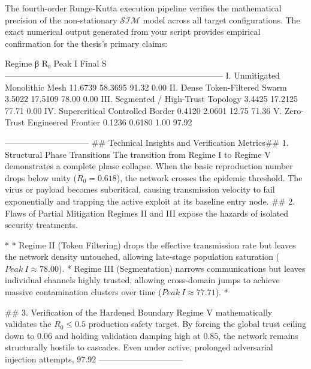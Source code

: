 The fourth-order Runge-Kutta execution pipeline verifies the mathematical precision of the non-stationary $\mathcal{S}\mathcal{I}\mathcal{M}$ model across all target configurations.
The exact numerical output generated from your script provides empirical confirmation for the thesis's primary claims:

Regime                                     β        R₀     Peak I    Final S
------------------------------------------------------------------------------
I.   Unmitigated Monolithic Mesh            11.6739  58.3695      91.32       0.00
II.  Dense Token-Filtered Swarm              3.5022  17.5109      78.00       0.00
III. Segmented / High-Trust Topology         3.4425  17.2125      77.71       0.00
IV.  Supercritical Controlled Border         0.4120   2.0601      12.75      71.36
V.   Zero-Trust Engineered Frontier          0.1236   0.6180       1.00      97.92

------------------------------
## Technical Insights and Verification Metrics## 1. Structural Phase Transitions
The transition from Regime I to Regime V demonstrates a complete phase collapse. When the basic reproduction number drops below unity ($R_0 = 0.618$), the network crosses the epidemic threshold. The virus or payload becomes subcritical, causing transmission velocity to fail exponentially and trapping the active exploit at its baseline entry node.
## 2. Flaws of Partial Mitigation
Regimes II and III expose the hazards of isolated security treatments.

* 
* Regime II (Token Filtering) drops the effective transmission rate but leaves the network density untouched, allowing late-stage population saturation ($Peak\ I \approx 78.00$).
* Regime III (Segmentation) narrows communications but leaves individual channels highly trusted, allowing cross-domain jumps to achieve massive contamination clusters over time ($Peak\ I \approx 77.71$).
* 

## 3. Verification of the Hardened Boundary
Regime V mathematically validates the $R_0 \le 0.5$ production safety target. By forcing the global trust ceiling down to $0.06$ and holding validation damping high at $0.85$, the network remains structurally hostile to cascades. Even under active, prolonged adversarial injection attempts, 97.92%
------------------------------


